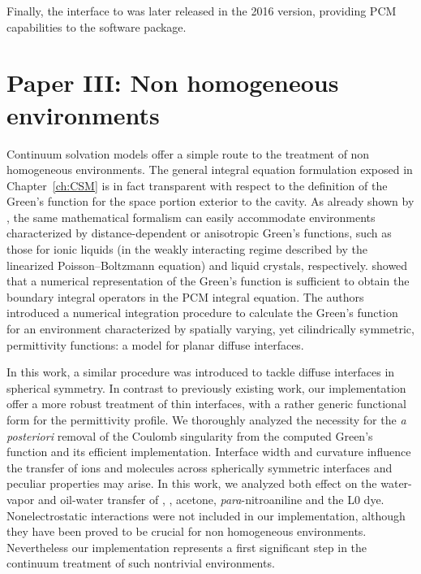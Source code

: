 Finally, the interface to \LSDALTON was later released in the 2016 version,
providing \acs{PCM} capabilities to the software package.

\section*{Paper III: Non homogeneous environments}

Continuum solvation models offer a simple route to the treatment of non
homogeneous environments.
The general integral equation formulation exposed in Chapter~\ref{ch:CSM} is in
fact transparent with respect to the definition of the Green's function for the
space portion exterior to the cavity.
As already shown by \citeauthor{Cances1998-og}, the same mathematical formalism can easily accommodate
environments characterized by distance-dependent or anisotropic Green's functions, such as those for
ionic liquids (in the weakly interacting regime described by the linearized Poisson--Boltzmann equation)
and liquid crystals, respectively.
\citeauthor{Frediani2004-er} showed that a numerical representation of the
Green's function is sufficient to obtain the boundary integral operators in the
\acs{PCM} integral equation.
The authors introduced a numerical integration procedure to calculate the
Green's function for an environment characterized by spatially varying, yet
cilindrically symmetric, permittivity functions: a model for planar diffuse interfaces.

In this work, a similar procedure was introduced to tackle diffuse interfaces
in spherical symmetry.
In contrast to previously existing work, our implementation offer a more robust
treatment of thin interfaces, with a rather generic functional form for the
permittivity profile.
We thoroughly analyzed the necessity for the \emph{a posteriori} removal of the
Coulomb singularity from the computed Green's function and its efficient
implementation.
Interface width and curvature influence the transfer of ions and molecules across
spherically symmetric interfaces and peculiar properties may arise.
In this work, we analyzed both effect on the water-vapor and oil-water transfer
of , , acetone, \emph{para}-nitroaniline and the L0 dye.
Nonelectrostatic interactions were not included in our implementation, although
they have been proved to be crucial for non homogeneous
environments.~\autocite{Mozgawa2014-ad}
Nevertheless our implementation represents a first significant step in the continuum treatment
of such nontrivial environments.

